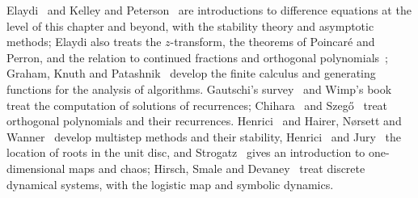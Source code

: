 Elaydi~\cite{elaydi2005} and Kelley and Peterson~\cite{kelley2001} are introductions to difference equations at the level of this chapter and beyond, with the stability theory and asymptotic methods; Elaydi also treats the $z$-transform, the theorems of Poincar\'e and Perron, and the relation to continued fractions and orthogonal polynomials~\cite[Chaps.~6, 8 and~9]{elaydi2005}; Graham, Knuth and Patashnik~\cite{graham1994concrete} develop the finite calculus and generating functions for the analysis of algorithms. Gautschi's survey~\cite{gautschi1967} and Wimp's book~\cite{wimp1984} treat the computation of solutions of recurrences; Chihara~\cite{chihara1978} and Szeg\H{o}~\cite{szego1975} treat orthogonal polynomials and their recurrences. Henrici~\cite{henrici1962discrete} and Hairer, N{\o}rsett and Wanner~\cite[Chap.~III]{hairer1993} develop multistep methods and their stability, Henrici~\cite{henrici1974} and Jury~\cite{jury1964} the location of roots in the unit disc, and Strogatz~\cite[Chap.~10]{strogatz2015} gives an introduction to one-dimensional maps and chaos; Hirsch, Smale and Devaney~\cite[Chap.~15]{hirsch2013} treat discrete dynamical systems, with the logistic map and symbolic dynamics.

\chapterreferences
